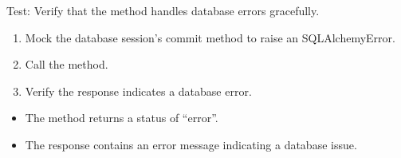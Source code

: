 \documentclass[letterpaper,10pt,english]{sphinxmanual}
\begin{document}
\begin{fulllineitems}
\label{\detokenize{test:test.test_admin.test_update_admin_password_database_error}}
\pysigstartsignatures
\pysiglinewithargsret
{}
{\sphinxparamcomma {}}
{}
\pysigstopsignatures
\sphinxAtStartPar
Test: Verify that the method handles database errors gracefully.
\begin{description}
\begin{enumerate}
%
\item {} 
\sphinxAtStartPar
Mock the database session’s commit method to raise an SQLAlchemyError.

\item {} 
\sphinxAtStartPar
Call the  method.

\item {} 
\sphinxAtStartPar
Verify the response indicates a database error.

\end{enumerate}

\begin{itemize}
\item {} 
\sphinxAtStartPar
The method returns a status of “error”.

\item {} 
\sphinxAtStartPar
The response contains an error message indicating a database issue.

\end{itemize}

\end{description}

\end{fulllineitems}

\end{document}
